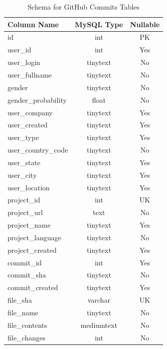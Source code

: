 \documentclass[12pt]{article}
\begin{document}
\begin{table}[h!]
    \begin{center}
        \caption{Schema for GitHub Commits Tables}
        \label{tab:git_commit_schema}
        \begin{tabular}{|l | c | c |}
            \hline
            \textbf{Column Name} & \textbf{MySQL Type} & \textbf{Nullable}\\
            \hline
            id & int & PK\\
            user{\_}id & int & Yes\\
            user{\_}login & tinytext & No\\
            user{\_}fullname & tinytext & No\\
            gender & tinytext & No\\
            gender{\_}probability & float & No\\
            user{\_}company  & tinytext & Yes\\
            user{\_}created & tinytext & Yes\\
            user{\_}type & tinytext & Yes\\
            user{\_}country{\_}code & tinytext & No\\
            user{\_}state & tinytext & Yes\\
            user{\_}city & tinytext & Yes\\
            user{\_}location & tinytext & Yes\\
            \hline
            project{\_}id & int & UK\\
            project{\_}url & text & No\\
            project{\_}name & tinytext & Yes\\
            project{\_}language & tinytext & No\\
            project{\_}created & tinytext & Yes\\
            \hline
            commit{\_}id & int & Yes\\
            commit{\_}sha & tinytext & No\\
            commit{\_}created & tinytext & Yes\\
            \hline
            file{\_}sha & varchar & UK\\
            file{\_}name & tinytext & No\\
            file{\_}contents & mediumtext & No\\
            file{\_}changes & int & No\\
            \hline
        \end{tabular}
    \end{center}
\end{table}
\end{document}

